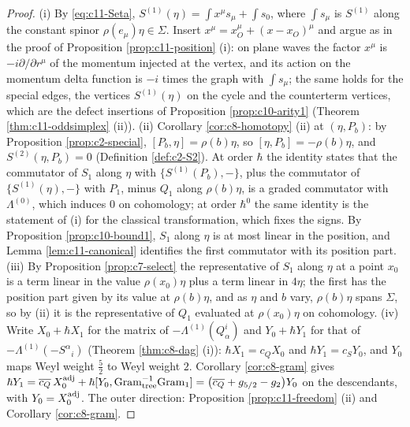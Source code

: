 \begin{proof}
(i) By \eqref{eq:c11-Seta}, $S^{(1)}(\eta)=\int x^\mu s_\mu+\int s_0$, where $\int s_\mu$ is $S^{(1)}$ along the constant spinor $\rho(e_\mu)\eta\in\Sigma$. Insert $x^\mu=x_O^\mu+(x-x_O)^\mu$ and argue as in the proof of Proposition \ref{prop:c11-position} (i): on plane waves the factor $x^\mu$ is $-i\partial/\partial r^\mu$ of the momentum injected at the vertex, and its action on the momentum delta function is $-i$ times the graph with $\int s_\mu$; the same holds for the special edges, the vertices $S^{(1)}(\eta)$ on the cycle and the counterterm vertices, which are the defect insertions of Proposition \ref{prop:c10-arity1} (Theorem \ref{thm:c11-oddsimplex} (ii)). (ii) Corollary \ref{cor:c8-homotopy} (ii) at $(\eta,P_b)$: by Proposition \ref{prop:c2-special}, $[P_b,\eta]=\rho(b)\eta$, so $[\eta,P_b]=-\rho(b)\eta$, and $S^{(2)}(\eta,P_b)=0$ (Definition \ref{def:c2-S2}). At order $\hbar$ the identity states that the commutator of $S_1$ along $\eta$ with $\{S^{(1)}(P_b),-\}$, plus the commutator of $\{S^{(1)}(\eta),-\}$ with $P_1$, minus $Q_1$ along $\rho(b)\eta$, is a graded commutator with $\Lambda^{(0)}$, which induces $0$ on cohomology; at order $\hbar^0$ the same identity is the statement of (i) for the classical transformation, which fixes the signs. By Proposition \ref{prop:c10-bound1}, $S_1$ along $\eta$ is at most linear in the position, and Lemma \ref{lem:c11-canonical} identifies the first commutator with its position part. (iii) By Proposition \ref{prop:c7-select} the representative of $S_1$ along $\eta$ at a point $x_0$ is a term linear in the value $\rho(x_0)\eta$ plus a term linear in $4\eta$; the first has the position part given by its value at $\rho(b)\eta$, and as $\eta$ and $b$ vary, $\rho(b)\eta$ spans $\Sigma$, so by (ii) it is the representative of $Q_1$ evaluated at $\rho(x_0)\eta$ on cohomology. (iv) Write $X_0+\hbar X_1$ for the matrix of $-\Lambda^{(1)}(Q^i_\alpha)$ and $Y_0+\hbar Y_1$ for that of $-\Lambda^{(1)}(-S^\alpha{}_i)$ (Theorem \ref{thm:c8-dag} (i)): $\hbar X_1=c_QX_0$ and $\hbar Y_1=c_SY_0$, and $Y_0$ maps Weyl weight $\tfrac52$ to Weyl weight $2$. Corollary \ref{cor:c8-gram} gives $\hbar Y_1=\overline{c_Q}\,X_0^{\rm adj}+\hbar[Y_0,\mathrm{Gram}_{\rm tree}^{-1}\mathrm{Gram}_{\rm 1}]=\big(\overline{c_Q}+g_{5/2}-g_2\big)Y_0$ on the descendants, with $Y_0=X_0^{\rm adj}$. The outer direction: Proposition \ref{prop:c11-freedom} (ii) and Corollary \ref{cor:c8-gram}.
\end{proof}

